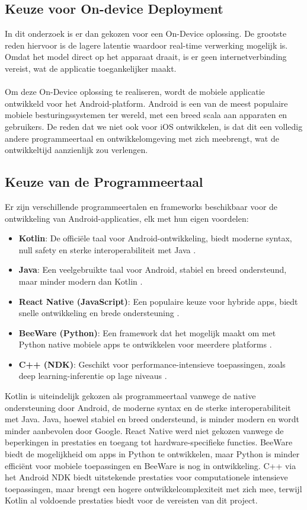 \subsection{Keuze voor On-device Deployment}
In dit onderzoek is er dan gekozen voor een On-Device oplossing.
De grootste reden hiervoor is de lagere latentie waardoor real-time verwerking mogelijk is.
Omdat het model direct op het apparaat draait, is er geen internetverbinding vereist, wat de applicatie toegankelijker maakt.
\\
\\
Om deze On-Device oplossing te realiseren, wordt de mobiele applicatie ontwikkeld voor het Android-platform. 
Android is een van de meest populaire mobiele besturingssystemen ter wereld, met een breed scala aan apparaten en gebruikers.
De reden dat we niet ook voor iOS ontwikkelen, is dat dit een volledig andere programmeertaal en ontwikkelomgeving met zich meebrengt, wat de ontwikkeltijd aanzienlijk zou verlengen.
\subsection{Keuze van de Programmeertaal}
\label{subsec:keuze-programmeertaal}
Er zijn verschillende programmeertalen en frameworks beschikbaar voor de ontwikkeling van Android-applicaties, elk met hun eigen voordelen:

\begin{itemize}
  \item \textbf{Kotlin}: De officiële taal voor Android-ontwikkeling, biedt moderne syntax, null safety en sterke interoperabiliteit met Java \autocite{google_kotlin}.  
  \item \textbf{Java}: Een veelgebruikte taal voor Android, stabiel en breed ondersteund, maar minder modern dan Kotlin \autocite{java_android}.  
  \item \textbf{React Native (JavaScript)}: Een populaire keuze voor hybride apps, biedt snelle ontwikkeling en brede ondersteuning \autocite{react_native}.  
  \item \textbf{BeeWare (Python)}: Een framework dat het mogelijk maakt om met Python native mobiele apps te ontwikkelen voor meerdere platforms \autocite{beeware}.  
  \item \textbf{C++ (NDK)}: Geschikt voor performance-intensieve toepassingen, zoals deep learning-inferentie op lage niveaus \autocite{android_ndk}.  
\end{itemize}

Kotlin is uiteindelijk gekozen als programmeertaal vanwege de native ondersteuning door Android, de moderne syntax en de sterke interoperabiliteit met Java. 
Java, hoewel stabiel en breed ondersteund, is minder modern en wordt minder aanbevolen door Google. 
React Native werd niet gekozen vanwege de beperkingen in prestaties en toegang tot hardware-specifieke functies. 
BeeWare biedt de mogelijkheid om apps in Python te ontwikkelen, maar Python is minder efficiënt voor mobiele toepassingen en BeeWare is nog in ontwikkeling. 
C++ via het Android NDK biedt uitstekende prestaties voor computationele intensieve toepassingen, maar brengt een hogere ontwikkelcomplexiteit met zich mee, terwijl Kotlin al voldoende prestaties biedt voor de vereisten van dit project.

